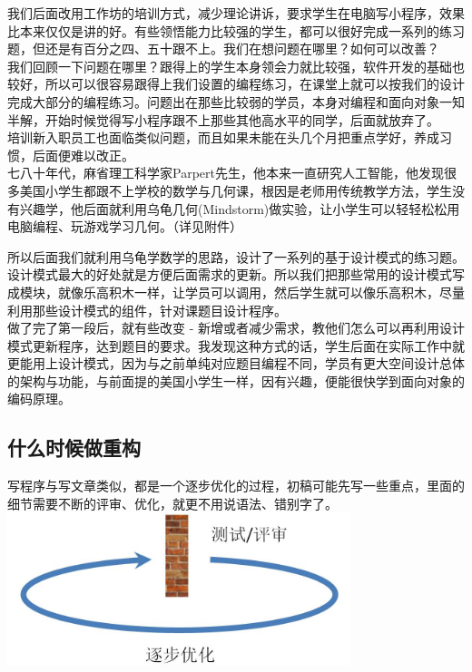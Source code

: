 我们后面改用工作坊的培训方式，减少理论讲诉，要求学生在电脑写小程序，效果比本来仅仅是讲的好。有些领悟能力比较强的学生，都可以很好完成一系列的练习题，但还是有百分之四、五十跟不上。我们在想问题在哪里？如何可以改善？\\
我们回顾一下问题在哪里？跟得上的学生本身领会力就比较强，软件开发的基础也较好，所以可以很容易跟得上我们设置的编程练习，在课堂上就可以按我们的设计完成大部分的编程练习。问题出在那些比较弱的学员，本身对编程和面向对象一知半解，开始时候觉得写小程序跟不上那些其他高水平的同学，后面就放弃了。\\
培训新入职员工也面临类似问题，而且如果未能在头几个月把重点学好，养成习惯，后面便难以改正。\\
七八十年代，麻省理工科学家Parpert先生，他本来一直研究人工智能，他发现很多美国小学生都跟不上学校的数学与几何课，根因是老师用传统教学方法，学生没有兴趣学，他后面就利用乌龟几何(Mindstorm)做实验，让小学生可以轻轻松松用电脑编程、玩游戏学习几何。（详见附件）

所以后面我们就利用乌龟学数学的思路，设计了一系列的基于设计模式的练习题。设计模式最大的好处就是方便后面需求的更新。所以我们把那些常用的设计模式写成模块，就像乐高积木一样，让学员可以调用，然后学生就可以像乐高积木，尽量利用那些设计模式的组件，针对课题目设计程序。\\
做了完了第一段后，就有些改变 -
新增或者减少需求，教他们怎么可以再利用设计模式更新程序，达到题目的要求。我发现这种方式的话，学生后面在实际工作中就更能用上设计模式，因为与之前单纯对应题目编程不同，学员有更大空间设计总体的架构与功能，与前面提的美国小学生一样，因有兴趣，便能很快学到面向对象的编码原理。\\

\hypertarget{ux4ec0ux4e48ux65f6ux5019ux505aux91cdux6784}{%
\subsection{什么时候做重构}\label{ux4ec0ux4e48ux65f6ux5019ux505aux91cdux6784}}

写程序与写文章类似，都是一个逐步优化的过程，初稿可能先写一些重点，里面的细节需要不断的评审、优化，就更不用说语法、错别字了。\\

\includegraphics[width=10cm]{环形图1.jpg}

